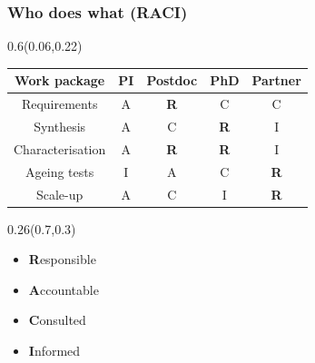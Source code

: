 \documentclass[aspectratio=169]{beamer}
\begin{document}
\begin{frame}[t]
  \frametitle{Who does what (RACI)}

\begin{textblock}{0.6}(0.06,0.22)
{\setlength{\arrayrulewidth}{0.8pt} \fontsize{13}{16}\selectfont \begin{tabular}{|c|c|c|c|c|}
\hline
  \rowcolor{ksTH5B2C83}\textcolor{ksTFFFFFFF}{\textbf{Work package}} & \textcolor{ksTFFFFFFF}{\textbf{PI}} & \textcolor{ksTFFFFFFF}{\textbf{Postdoc}} & \textcolor{ksTFFFFFFF}{\textbf{PhD}} & \textcolor{ksTFFFFFFF}{\textbf{Partner}} \\
\hline
  Requirements & A & \textbf{R} & C & C \\
\hline
  \rowcolor{ksTSEEE6F5}Synthesis & A & C & \textbf{R} & I \\
\hline
  Characterisation & A & \textbf{R} & \textbf{R} & I \\
\hline
  \rowcolor{ksTSEEE6F5}Ageing tests & I & A & C & \textbf{R} \\
\hline
  Scale-up & A & C & I & \textbf{R} \\
\hline
\end{tabular}}
\end{textblock}

\begin{textblock}{0.26}(0.7,0.3)
{\raggedright\fontsize{14}{17}\selectfont \begin{itemize}
\item \textbf{R}esponsible
\item \textbf{A}ccountable
\item \textbf{C}onsulted
\item \textbf{I}nformed
\end{itemize}\par}
\end{textblock}
\end{frame}
\end{document}
